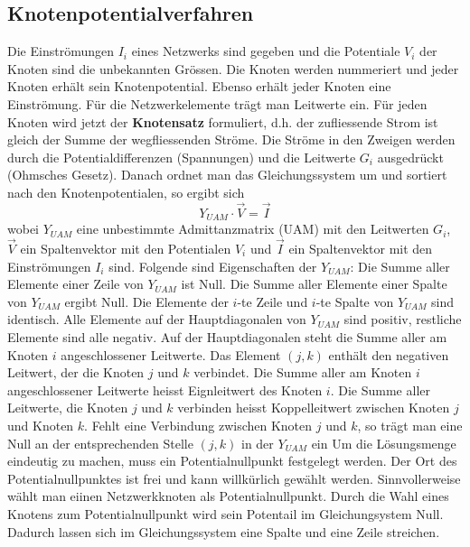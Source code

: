\subsection{Knotenpotentialverfahren}
Die Einströmungen $I_i$ eines Netzwerks sind gegeben und die Potentiale $V_i$ der Knoten sind die unbekannten Grössen. Die Knoten werden nummeriert und jeder Knoten erhält sein Knotenpotential. Ebenso erhält jeder Knoten eine Einströmung. Für die Netzwerkelemente trägt man Leitwerte ein.
\newline\newline
Für jeden Knoten wird jetzt der \textbf{Knotensatz} formuliert, d.h. der zufliessende Strom ist gleich der Summe der wegfliessenden Ströme. Die Ströme in den Zweigen werden durch die Potentialdifferenzen (Spannungen) und die Leitwerte $G_i$ ausgedrückt (Ohmsches Gesetz). Danach ordnet man das Gleichungssystem um und sortiert nach den Knotenpotentialen, so ergibt sich
\begin{equation}
\boxed{Y_{UAM}\cdot \overrightarrow{V}=\overrightarrow{I}}
\end{equation}
wobei $Y_{UAM}$ eine unbestimmte Admittanzmatrix (UAM) mit den Leitwerten $G_i$, $\overrightarrow{V}$ ein Spaltenvektor mit den Potentialen $V_i$ und $\overrightarrow{I}$ ein Spaltenvektor mit den Einströmungen $I_i$ sind. Folgende sind Eigenschaften der $Y_{UAM}$:
\newline\newline
Die Summe aller Elemente einer Zeile von $Y_{UAM}$ ist Null. Die Summe aller Elemente einer Spalte von $Y_{UAM}$ ergibt Null. Die Elemente der $i$-te Zeile und $i$-te Spalte von $Y_{UAM}$ sind identisch. Alle Elemente auf der Hauptdiagonalen von $Y_{UAM}$ sind positiv, restliche Elemente sind alle negativ. Auf der Hauptdiagonalen steht die Summe aller am Knoten $i$ angeschlossener Leitwerte. Das Element $\left(j,k\right)$ enthält den negativen Leitwert, der die Knoten $j$ und $k$ verbindet. Die Summe aller am Knoten $i$ angeschlossener Leitwerte heisst Eignleitwert des Knoten $i$. Die Summe aller Leitwerte, die Knoten $j$ und $k$ verbinden heisst Koppelleitwert zwischen Knoten $j$ und Knoten $k$. Fehlt eine Verbindung zwischen Knoten $j$ und $k$, so trägt man eine Null an der entsprechenden Stelle $\left(j,k\right)$ in der $Y_{UAM}$ ein
\newline\newline
Um die Lösungsmenge eindeutig zu machen, muss ein Potentialnullpunkt festgelegt werden. Der Ort des Potentialnullpunktes ist frei und kann willkürlich gewählt werden. Sinnvollerweise wählt man eiinen Netzwerkknoten als Potentialnullpunkt. Durch die Wahl eines Knotens zum Potentialnullpunkt wird sein Potentail im Gleichungsystem Null. Dadurch lassen sich im Gleichungssystem eine Spalte und eine Zeile streichen.
